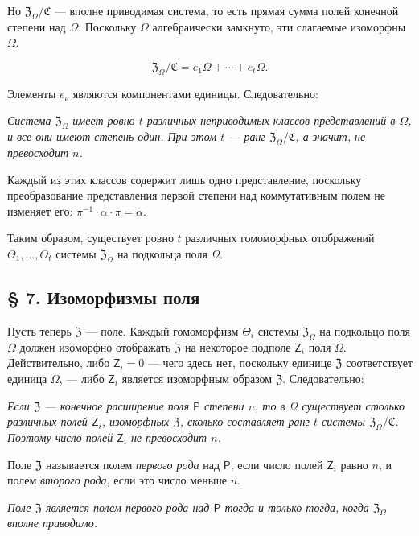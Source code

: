 \documentclass[11pt]{article}
\begin{document}
Но \(\mathfrak Z_\Omega/\mathfrak C\) --- вполне приводимая система, то есть прямая сумма полей конечной степени над \(\Omega\). Поскольку \(\Omega\) алгебраически замкнуто, эти слагаемые изоморфны \(\Omega\).

\[
\mathfrak Z_\Omega/\mathfrak C=e_1\Omega+\cdots+e_t\Omega.
\]

Элементы \(e_\nu\) являются компонентами единицы. Следовательно:

\emph{Система \(\mathfrak Z_\Omega\) имеет ровно \(t\) различных неприводимых классов представлений в \(\Omega\), и все они имеют степень один. При этом \(t\) --- ранг \(\mathfrak Z_\Omega/\mathfrak C\), а значит, не превосходит \(n\).}

Каждый из этих классов содержит лишь одно представление, поскольку преобразование представления первой степени над коммутативным полем не изменяет его: \(\pi^{-1}\cdot\alpha\cdot\pi=\alpha\).

Таким образом, существует ровно \(t\) различных гомоморфных отображений \(\Theta_1,\ldots,\Theta_t\) системы \(\mathfrak Z_\Omega\) на подкольца поля \(\Omega\).

\subsection*{§ 7. Изоморфизмы поля}\label{die-isomorphismen-eines-koerpers}

Пусть теперь \(\mathfrak Z\) --- поле. Каждый гомоморфизм \(\Theta_i\) системы \(\mathfrak Z_\Omega\) на подкольцо поля \(\Omega\) должен изоморфно отображать \(\mathfrak Z\) на некоторое подполе \(\mathsf{Z}_i\) поля \(\Omega\). Действительно, либо \(\mathsf{Z}_i=0\) --- чего здесь нет, поскольку единице \(\mathfrak Z\) соответствует единица \(\Omega\), --- либо \(\mathsf{Z}_i\) является изоморфным образом \(\mathfrak Z\). Следовательно:

\emph{Если \(\mathfrak Z\) --- конечное расширение поля \(\mathsf P\) степени \(n\), то в \(\Omega\) существует столько различных полей \(\mathsf{Z}_i\), изоморфных \(\mathfrak Z\), сколько составляет ранг \(t\) системы \(\mathfrak Z_\Omega/\mathfrak C\). Поэтому число полей \(\mathsf{Z}_i\) не превосходит \(n\).}

Поле \(\mathfrak Z\) называется полем \emph{первого рода} над \(\mathsf P\), если число полей \(\mathsf{Z}_i\) равно \(n\), и полем \emph{второго рода}, если это число меньше \(n\).

\emph{Поле \(\mathfrak Z\) является полем первого рода над \(\mathsf P\) тогда и только тогда, когда \(\mathfrak Z_\Omega\) вполне приводимо.}
\end{document}
